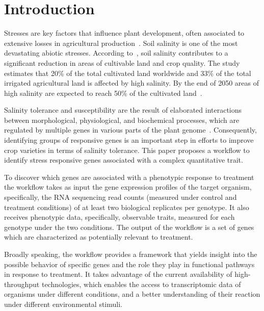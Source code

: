 \section*{Introduction}
\label{sec.intro}

Stresses are key factors that influence plant
development, often associated to extensive
losses in agricultural production~\cite{mesterhazy2020losses, shrivastava2015soil}. 
Soil salinity is one of the
most devastating abiotic stresses. According to~\cite{shrivastava2015soil}, 
soil salinity contributes to a significant reduction in areas of cultivable
land and crop quality. The study estimates that 
20\% of the total cultivated land worldwide and 
33\% of the total irrigated agricultural land
is affected by high salinity. 
By the end of 2050 areas of high salinity are
expected to reach 50\% of the cultivated land~\cite{shrivastava2015soil}. 
\vspace{0.5cm}

Salinity tolerance and
susceptibility are the result of elaborated
interactions between morphological, physiological, and biochemical
processes, which are regulated by multiple genes in
various parts of the plant genome~\cite{reddy2017salt}. Consequently,
identifying groups of responsive genes is an important step in efforts to
improve crop varieties in terms of salinity tolerance.
This paper proposes a workflow to identify stress responsive genes
associated with a complex quantitative trait.
\vspace{0.5cm}

To discover which genes are associated with a phenotypic response to
treatment the workflow takes as input
the gene expression profiles of the target organism, specifically, 
the RNA sequencing read counts (measured under control
and treatment conditions)
of at least two biological replicates per genotype. It also receives phenotypic data, specifically, observable traits, measured for each genotype under the two conditions. The output of the
workflow is a set of genes which are characterized as potentially relevant
to treatment. 
\vspace{0.5cm}

Broadly speaking, the workflow provides a framework that yields insight into the possible behavior of specific
genes and the role they play in functional pathways in response to
treatment. 
It takes advantage of
the current availability of high-throughput technologies, which
enables the access to transcriptomic data of organisms under different conditions, 
and a better understanding of their reaction under different
environmental stimuli.
\vspace{0.5cm}

